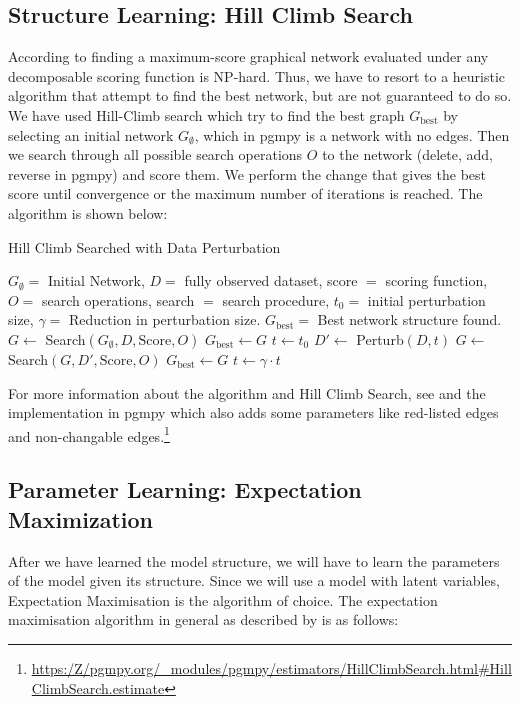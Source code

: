 \subsection{Structure Learning: Hill Climb Search}
\label{HillClimbSearch}
According to \citet[p.~811]{Koller:2009:Book} finding a maximum-score graphical network evaluated under any decomposable scoring function is NP-hard. Thus, we have to resort to a heuristic algorithm that attempt to find the best network, but are not guaranteed to do so. We have used Hill-Climb search which try to find the best graph $G_{\text{best}}$ by selecting an initial network $G_{\emptyset}$, which in pgmpy is a network with no edges. Then we search through all possible search operations $O$ to the network (delete, add, reverse in pgmpy) and score them. We perform the change that gives the best score until convergence or the maximum number of iterations is reached. The algorithm is shown below:

\begin{algorithm}
    \caption{Hill Climb Searched with Data Perturbation}
    \begin{algorithmic}
        \REQUIRE $G_{\emptyset} = $ Initial Network, $D = $ fully observed dataset, score $ = $ scoring function, $O = $ search operations, search $ = $ search procedure, $t_0 = $ initial perturbation size, $\gamma = $ Reduction in perturbation size.
        \ENSURE $G_{\text{best}} = $ Best network structure found.
        \STATE $G \leftarrow$ Search$(G_{\emptyset}, D, \text{Score}, O)$ 
        \STATE $G_{\text{best}} \leftarrow G$
        \STATE $t \leftarrow t_0$
        \STATE $D' \leftarrow $ Perturb$(D,t)$
        \STATE $G \leftarrow$ Search$(G, D', \text{Score}, O)$
            \STATE $G_{\text{best}} \leftarrow G$
        \ENDIF
        \STATE $t \leftarrow \gamma \cdot t$
        \ENDFOR
    \end{algorithmic}
\end{algorithm}

For more information about the algorithm and Hill Climb Search, see \cite[p.~816--819]{Koller:2009:Book} and the implementation in pgmpy which also adds some parameters like red-listed edges and non-changable edges.\footnote{\url{https:/Z/pgmpy.org/_modules/pgmpy/estimators/HillClimbSearch.html\#HillClimbSearch.estimate}}

\subsection{Parameter Learning: Expectation Maximization}
\label{Expectation Maximization}
After we have learned the model structure, we will have to learn the parameters of the model given its structure. Since we will use a model with latent variables, Expectation Maximisation is the algorithm of choice. The expectation maximisation algorithm in general as described by \citet{Murphy:2012:Book, Bishop:2006:Book} is as follows:

